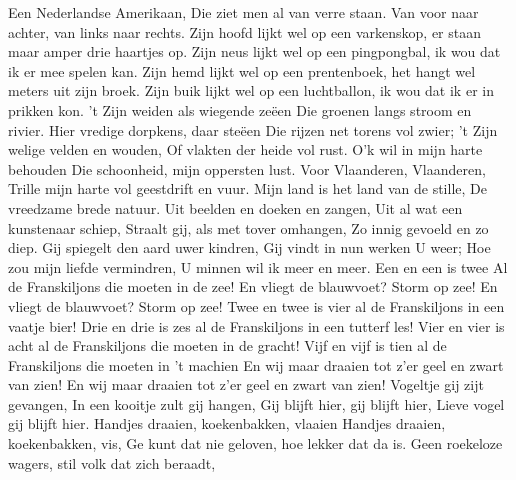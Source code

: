 \documentclass{article}
\begin{document}
\begin{songs}{}
\begin{intersong}
\end{intersong}
\beginverse*
Een Nederlandse Amerikaan,
Die ziet men al van verre staan. 
\endverse
\beginchorus
Van voor naar achter, van links naar rechts. 
\endchorus
\beginverse*
Zijn hoofd lijkt wel op een varkenskop,
er staan maar amper drie haartjes op. 
\endverse
\beginverse*
Zijn neus lijkt wel op een pingpongbal,
ik wou dat ik er mee spelen kan. 
\endverse
\beginverse*
Zijn hemd lijkt wel op een prentenboek,
het hangt wel meters uit zijn broek. 
\endverse
\beginverse*
Zijn buik lijkt wel op een luchtballon,
ik wou dat ik er in prikken kon. 
\endverse
\endsong
{}
\beginverse*
't Zijn weiden als wiegende zeëen
Die groenen langs stroom en rivier.
Hier vredige dorpkens, daar steëen
Die rijzen net torens vol zwier;
't Zijn welige velden en wouden,
Of vlakten der heide vol rust.
O'k wil in mijn harte behouden
Die schoonheid, mijn oppersten lust.
\endverse
\beginchorus
Voor Vlaanderen, Vlaanderen,
Trille mijn harte vol geestdrift en vuur.
Mijn land is het land van de stille,
De vreedzame brede natuur.
\endchorus
\beginverse*
Uit beelden en doeken en zangen,
Uit al wat een kunstenaar schiep,
Straalt gij, als met tover omhangen,
Zo innig gevoeld en zo diep.
Gij spiegelt den aard uwer kindren,
Gij vindt in nun werken U weer;
Hoe zou mijn liefde vermindren,
U minnen wil ik meer en meer.
\endverse
\endsong
{}
\beginverse
Een en een is twee  Al de Franskiljons die moeten in de zee!
\endverse
\beginchorus
En vliegt de blauwvoet? Storm op zee!
En vliegt de blauwvoet? Storm op zee!
\endchorus
\beginverse
Twee en twee is vier  al de Franskiljons in een vaatje bier!
\endverse
\beginverse
Drie en drie is zes  al de Franskiljons in een tutterf les!
\endverse
\beginverse
Vier en vier is acht  al de Franskiljons die moeten in de gracht!
\endverse
\beginverse
Vijf en vijf is tien  al de Franskiljons die moeten in 't machien
\endverse
\beginchorus
En wij maar draaien  tot z'er geel en zwart van zien!
En wij maar draaien  tot z'er geel en zwart van zien!
\endchorus
\endsong
{}
\beginverse*
Vogeltje gij zijt gevangen,
In een kooitje zult gij hangen,
Gij blijft hier, gij blijft hier,
Lieve vogel gij blijft hier.
Handjes draaien, koekenbakken, vlaaien
Handjes draaien, koekenbakken, vis,
Ge kunt dat nie geloven, hoe lekker dat da is. 
\endverse
\endsong
{}
\beginverse*
Geen roekeloze wagers, stil volk dat zich beraadt,

\end{songs}
\end{document}
